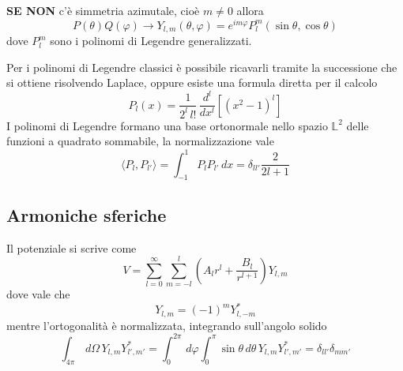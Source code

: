 \textbf{SE NON} c'è simmetria azimutale, cioè $ m\neq0 $ allora
\begin{equation}
  P(\theta) Q(\varphi) \to Y_{l,m} (\theta, \varphi) = e^{im\varphi} P_l^m(\sin\theta,\cos\theta)
\end{equation}
dove $ P_l^m $ sono i polinomi di Legendre generalizzati.

Per i polinomi di Legendre classici è possibile ricavarli tramite la successione che si ottiene risolvendo Laplace, oppure esiste una formula diretta 
per il calcolo
\begin{equation}
  P_l(x) = \frac{1}{2^l \, l!} \,\frac{d^l}{dx^l} \left[ \left( x^2 -1 \right)^l \right] \tag*{[Formula di Rodrigues]}
\end{equation}
I polinomi di Legendre formano una base ortonormale nello spazio $ \mathbb{L}^2 $ delle funzioni a quadrato sommabile, la normalizzazione vale
\begin{equation}
  \langle P_l, P_{l'} \rangle = \int_{-1}^{1} P_l P_{l'}  \,dx = \delta_{ll'} \frac{2}{2l+1} 
\end{equation}

\subsection{Armoniche sferiche}
Il potenziale si scrive come
\begin{equation}
  V = \sum_{l=0}^{\infty} \sum_{m=-l}^{l} \left( A_l r^l + \frac{B_l}{r^{l+1}} \right) Y_{l,m}
\end{equation}
dove vale che
\begin{equation}
  Y_{l,m} = (-1)^m Y_{l,-m}^*
\end{equation}
mentre l'ortogonalità è normalizzata, integrando sull'angolo solido
\begin{equation}
  \int_{4\pi}  \,d\Omega \,Y_{l,m} Y_{l',m'}^*  = \int_0^{2\pi} \,d\varphi \int_0^{\pi} \sin\theta  \,d\theta \, Y_{l,m} Y_{l',m'}^* 
  = \delta_{ll'} \delta_{mm'} 
\end{equation}

